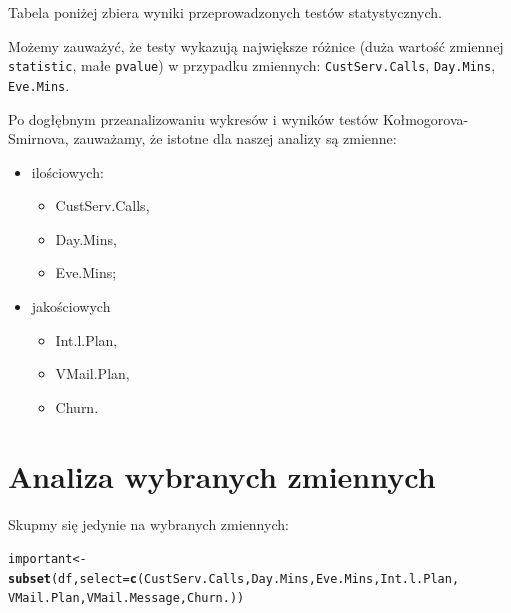 \documentclass{article}\usepackage[]{graphicx}\usepackage[]{color}
\makeatletter
\newcommand{\hlstd}[1]{\textcolor[rgb]{0.345,0.345,0.345}{#1}}%
\newcommand{\hlkwb}[1]{\textcolor[rgb]{0.69,0.353,0.396}{#1}}%
\newcommand{\hlkwc}[1]{\textcolor[rgb]{0.333,0.667,0.333}{#1}}%
\newcommand{\hlkwd}[1]{\textcolor[rgb]{0.737,0.353,0.396}{\textbf{#1}}}%
\newenvironment{kframe}{%
 \def\at@end@of@kframe{}%
 \ifinner\ifhmode%
  \def\at@end@of@kframe{\end{minipage}}%
  \begin{minipage}{\columnwidth}%
 \fi\fi%
 \def\FrameCommand##1{\hskip\@totalleftmargin \hskip-\fboxsep
 \colorbox{shadecolor}{##1}\hskip-\fboxsep
     \hskip-\linewidth \hskip-\@totalleftmargin \hskip\columnwidth}%
 \MakeFramed {\advance\hsize-\width
   \@totalleftmargin\z@ \linewidth\hsize
   \@setminipage}}%
 {\par\unskip\endMakeFramed%
 \at@end@of@kframe}
\newenvironment{knitrout}{}{} %
\makeatother
\begin{document}
Tabela poniżej zbiera wyniki przeprowadzonych testów statystycznych.
\begin{table}[!h]

\caption{\label{tab:Tabela z testami statystycznymi}Wyniki testu Kolmogorova-Smirnova}
\centering
{}
\end{table}


Możemy zauważyć, że testy wykazują największe różnice (duża wartość zmiennej \verb|statistic|, małe \verb|pvalue|) w przypadku zmiennych: \verb|CustServ.Calls|, \verb|Day.Mins|, \verb|Eve.Mins|.


Po dogłębnym przeanalizowaniu wykresów i wyników testów Kołmogorova-Smirnova, zauważamy, że istotne dla naszej analizy są zmienne:
\begin{itemize}
  \item ilościowych:
    \begin{itemize}
    \item CustServ.Calls,
    \item Day.Mins,
    \item Eve.Mins;
    \end{itemize}
  \item jakościowych
    \begin{itemize}
    \item Int.l.Plan,
    \item VMail.Plan,
    \item Churn.
    \end{itemize}
\end{itemize}

\section{Analiza wybranych zmiennych}
Skupmy się jedynie na wybranych zmiennych:
\begin{knitrout}
\color{fgcolor}\begin{kframe}
\begin{alltt}
\hlstd{important} \hlkwb{<-} \hlkwd{subset}\hlstd{(df,} \hlkwc{select}\hlstd{=}\hlkwd{c}\hlstd{(CustServ.Calls, Day.Mins, Eve.Mins, Int.l.Plan,}
                                 \hlstd{VMail.Plan, VMail.Message, Churn.))}
\end{alltt}
\end{kframe}
\end{knitrout}
\end{document}
